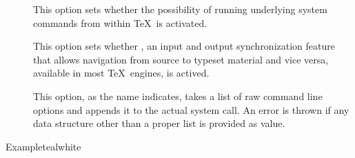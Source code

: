 \begin{description}
\begin{description}
\item[] This option sets whether the possibility of running underlying system commands from within \TeX\ is activated.

\item[] This option sets whether , an input and output synchronization feature that allows navigation from source to typeset material and vice versa, available in most \TeX\ engines, is actived.

\item[] This option, as the name indicates, takes a list of raw command line options and appends it to the actual system call. An error is thrown if any data structure other than a proper list is provided as value.
\end{description}

\begin{codebox}{Example}{teal}{\icnote}{white}
\end{codebox}

\end{description}





